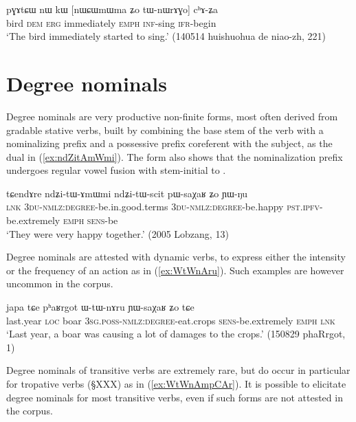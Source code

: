 \begin{exe}
\ex \label{ex:tWnWrAGo}
\gll pɣɤtɕɯ nɯ kɯ [nɯɕɯmɯma ʑo tɯ-nɯrɤɣo] cʰɤ-ʑa \\
bird \textsc{dem} \textsc{erg} immediately \textsc{emph} \textsc{inf}-sing \textsc{ifr}-begin \\
\glt `The bird immediately started to sing.' (140514 huishuohua de niao-zh, 221)
\end{exe}

\section{Degree nominals} \label{sec:degree.nominals}
Degree nominals are very productive non-finite forms, most often derived from gradable stative verbs, built by combining the base stem of the verb with a nominalizing  prefix and a possessive prefix coreferent with the subject, as the dual  in (\ref{ex:ndZitAmWmi}). The form  also shows that the nominalization  prefix undergoes regular vowel fusion with stem-initial  to . 

 \begin{exe}
\ex \label{ex:ndZitAmWmi}
\gll  tɕendɤre ndʑi-tɯ-ɤmɯmi ndʑi-tɯ-scit pɯ-saχaʁ ʑo ɲɯ-ŋu \\
 \textsc{lnk} \textsc{3du-nmlz:degree}-be.in.good.terms \textsc{3du-nmlz:degree}-be.happy \textsc{pst.ipfv}-be.extremely \textsc{emph} \textsc{sens}-be \\
 \glt `They were very happy together.' (2005 Lobzang, 13)
\end{exe}

Degree nominals are attested with dynamic verbs, to express either the intensity or the frequency of an action as in (\ref{ex:WtWnAru}). Such examples are however uncommon in the corpus.

\begin{exe}
\ex \label{ex:WtWnAru}
\gll  japa tɕe pʰaʁrgot ɯ-tɯ-nɤru ɲɯ-saχaʁ ʑo tɕe \\
last.year \textsc{loc} boar  \textsc{3sg}.\textsc{poss}-\textsc{nmlz}:\textsc{degree}-eat.crops \textsc{sens}-be.extremely \textsc{emph} \textsc{lnk} \\
\glt `Last year, a boar was causing a lot of damages to the crops.' (150829 phaRrgot, 1)
\end{exe}

Degree nominals of transitive verbs are extremely rare, but do occur in particular for tropative verbs (§XXX) as in (\ref{ex:WtWnAmpCAr}). It is possible to elicitate degree nominals for most transitive verbs, even if such forms are not attested in the corpus.
 
